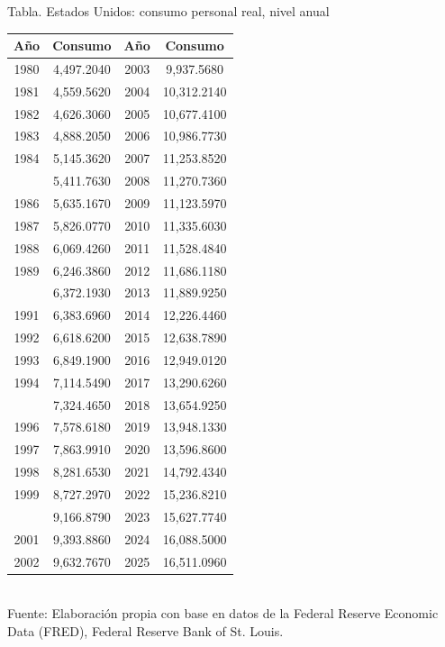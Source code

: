 \documentclass{article}\usepackage[]{graphicx}\usepackage[]{xcolor}
\begin{document}
\begin{center}
Tabla. Estados Unidos: consumo personal real, nivel anual
\end{center}
\begin{center}

\begin{tabular}{cccc}
\toprule
Año & Consumo & Año & Consumo\\
\midrule
1980 & 4,497.2040 & 2003 & 9,937.5680\\
1981 & 4,559.5620 & 2004 & 10,312.2140\\
1982 & 4,626.3060 & 2005 & 10,677.4100\\
1983 & 4,888.2050 & 2006 & 10,986.7730\\
1984 & 5,145.3620 & 2007 & 11,253.8520\\
\addlinespace
1985 & 5,411.7630 & 2008 & 11,270.7360\\
1986 & 5,635.1670 & 2009 & 11,123.5970\\
1987 & 5,826.0770 & 2010 & 11,335.6030\\
1988 & 6,069.4260 & 2011 & 11,528.4840\\
1989 & 6,246.3860 & 2012 & 11,686.1180\\
\addlinespace
1990 & 6,372.1930 & 2013 & 11,889.9250\\
1991 & 6,383.6960 & 2014 & 12,226.4460\\
1992 & 6,618.6200 & 2015 & 12,638.7890\\
1993 & 6,849.1900 & 2016 & 12,949.0120\\
1994 & 7,114.5490 & 2017 & 13,290.6260\\
\addlinespace
1995 & 7,324.4650 & 2018 & 13,654.9250\\
1996 & 7,578.6180 & 2019 & 13,948.1330\\
1997 & 7,863.9910 & 2020 & 13,596.8600\\
1998 & 8,281.6530 & 2021 & 14,792.4340\\
1999 & 8,727.2970 & 2022 & 15,236.8210\\
\addlinespace
2000 & 9,166.8790 & 2023 & 15,627.7740\\
2001 & 9,393.8860 & 2024 & 16,088.5000\\
2002 & 9,632.7670 & 2025 & 16,511.0960\\
\bottomrule
\end{tabular}
\\[0.3em]
{\footnotesize Fuente: Elaboración propia con base en datos de la Federal Reserve Economic Data (FRED), Federal Reserve Bank of St. Louis.}
\end{center}
\end{document}
